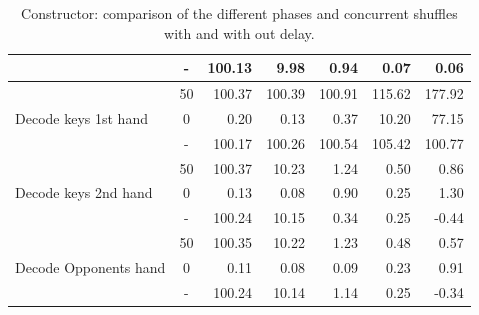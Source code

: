 \begin{table}[!htb]
\begin{subtable}{\textwidth}
{\begin{tabular}{l || c |r r r r r}
                              &  - & 100.13 &  9.98 & 0.94 & 0.07 & 0.06 \\
    \hline
    \multirow{3}{*}{Decode keys 1st hand} & 50 & 100.37 & 100.39 & 100.91 & 115.62 & 177.92 \\
                                          &  0 &   0.20 &   0.13 &   0.37 &  10.20 &  77.15 \\
                                          \cline{2-7}
                                          &  - & 100.17 & 100.26 & 100.54 & 105.42 & 100.77 \\
    \hline
    \multirow{3}{*}{Decode keys 2nd hand} & 50 & 100.37 & 10.23 & 1.24 & 0.50 & 0.86 \\
                                          &  0 &   0.13 &  0.08 & 0.90 & 0.25 & 1.30 \\
                                          \cline{2-7}
                                          &  - & 100.24 & 10.15 & 0.34 & 0.25 & -0.44 \\
    \hline
    \multirow{3}{*}{Decode Opponents hand} & 50 & 100.35 & 10.22 & 1.23 & 0.48 & 0.57 \\
                                           &  0 &   0.11 &  0.08 & 0.09 & 0.23 & 0.91 \\
                                           \cline{2-7}
                                           &  - & 100.24 & 10.14 & 1.14 & 0.25 & -0.34
    \end{tabular}
    }
    \caption{Constructor: comparison of the different phases and concurrent shuffles with and with out delay.}
    \end{subtable}%

    \vspace*{1cm}


\end{table}
